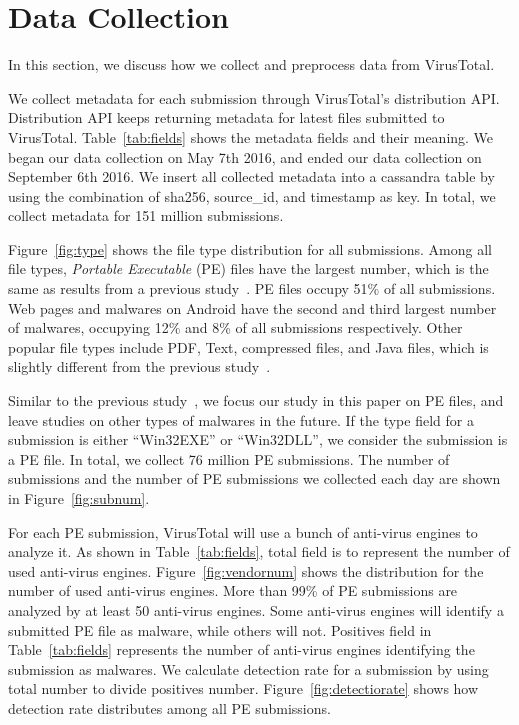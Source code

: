 \section{Data Collection}
\label{sec:label}


In this section, we discuss how we collect and preprocess data from VirusTotal. 



We collect metadata for each submission through VirusTotal’s distribution API. 
Distribution API keeps returning metadata for latest files submitted to VirusTotal.
Table~\ref{tab:fields} shows the metadata fields and their meaning.  
We began our data collection on May 7th 2016, 
and ended our data collection on September 6th 2016. 
We insert all collected metadata into a cassandra table by using the combination of sha256, source\_id, and timestamp as key.
In total, we collect metadata for 151 million submissions. 

Figure~\ref{fig:type} shows the file type distribution for all submissions. 
Among all file types, \textit{Portable Executable} (PE) files have the largest number, which is the same as results from a previous study~\cite{SongAPsys2016}.
PE files occupy 51\% of all submissions. 
Web pages and malwares on Android have the second and third largest number of malwares, 
occupying 12\% and 8\% of all submissions respectively. 
Other popular file types include PDF, Text, compressed files, and Java files, which is slightly different from the previous study~\cite{SongAPsys2016}. 

Similar to the previous study~\cite{SongAPsys2016}, 
we focus our study in this paper on PE files, 
and leave studies on other types of malwares in the future. 
If the type field for a submission is either ``Win32EXE'' or ``Win32DLL'', 
we consider the submission is a PE file. 
In total, we collect 76 million PE submissions. 
The number of submissions and the number of PE submissions we collected each day are shown in Figure~\ref{fig:subnum}. 





For each PE submission, VirusTotal will use a bunch of anti-virus engines to analyze it.
As shown in Table~\ref{tab:fields}, 
total field is to represent the number of used anti-virus engines. 
Figure~\ref{fig:vendornum} shows the distribution for the number of used anti-virus engines. 
More than 99\% of PE submissions are analyzed by at least 50 anti-virus engines. 
Some anti-virus engines will identify a submitted PE file as malware, while others will not. 
Positives field in Table~\ref{tab:fields} represents the number of anti-virus engines identifying the submission as malwares. 
We calculate detection rate for a submission by using total number to divide positives number. 
Figure~\ref{fig:detectiorate} shows how detection rate distributes among all PE submissions. 

